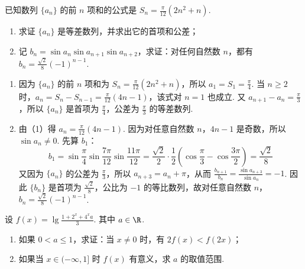 \documentclass[UTF8,a4paper,oneside,11pt]{ctexbook}
\begin{document}
\begin{problem}
已知数列 \(\{a_n\}\) 的前 \(n\) 项和的公式是 \(S_n=\frac{\pi}{12}(2n^2+n)\).
\begin{enumerate}
\item 求证 \(\{a_n\}\) 是等差数列，并求出它的首项和公差；
\item 记 \(b_n=\sin a_n\sin a_{n+1}\sin a_{n+2}\)，求证：对任何自然数 \(n\)，都有 \(b_n=\frac{\sqrt{2}}{8}(-1)^{n-1}\).
\end{enumerate}
\end{problem}

\begin{solution}
\begin{enumerate}
\item 因为 \(\{a_n\}\) 的前 \(n\) 项和为 \(S_n=\frac{\pi}{12}(2n^2+n)\)，所以 \(a_1=S_1=\frac{\pi}{4}\). 当 \(n\geqslant2\) 时，\(a_n=S_n-S_{n-1}=\frac{\pi}{12}(4n-1)\)，该式对 \(n=1\) 也成立. 又 \(a_{n+1}-a_n=\frac{\pi}{3}\)，所以 \(\{a_n\}\) 是首项为 \(\frac{\pi}{4}\)，公差为 \(\frac{\pi}{3}\) 的等差数列.

\item 由（1）得 \(a_n=\frac{\pi}{12}(4n-1)\). 因为对任意自然数 \(n\)，\(4n-1\) 是奇数，所以 \(\sin a_n\neq0\). 先算 \(b_1\)：
\[
b_1=\sin\frac{\pi}{4}\sin\frac{7\pi}{12}\sin\frac{11\pi}{12}
=\frac{\sqrt{2}}{2}\cdot\frac{1}{2}\left(\cos\frac{\pi}{3}-\cos\frac{3\pi}{2}\right)
=\frac{\sqrt{2}}{8}
\]
又因为 \(\{a_n\}\) 的公差为 \(\frac{\pi}{3}\)，所以 \(a_{n+3}=a_n+\pi\)，从而 \(\displaystyle\frac{b_{n+1}}{b_n}=\frac{\sin a_{n+3}}{\sin a_n}=-1\). 因此 \(\{b_n\}\) 是首项为 \(\frac{\sqrt{2}}{8}\)，公比为 \(-1\) 的等比数列，故对任意自然数 \(n\)，\(\displaystyle b_n=\frac{\sqrt{2}}{8}(-1)^{n-1}\).
\end{enumerate}
\end{solution}

\begin{problem}
设 \(f(x)=\lg\frac{1+2^x+4^xa}{3}\). 其中 \(a\in\R\).
\begin{enumerate}
\item 如果 \(0<a\leqslant1\)，求证：当 \(x\neq0\) 时，有 \(2f(x)<f(2x)\)；
\item 如果当 \(x\in(-\infty,1]\) 时 \(f(x)\) 有意义，求 \(a\) 的取值范围.
\end{enumerate}
\end{problem}
\end{document}
